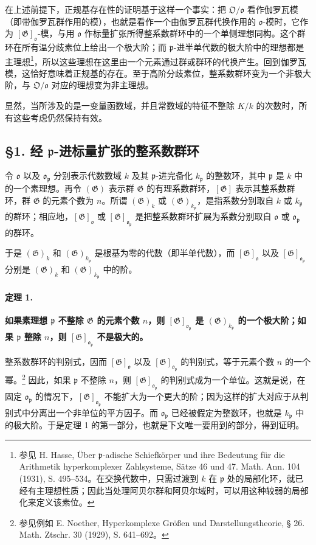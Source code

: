 \documentclass[11pt]{article}
\newcommand{\frakO}{\mathfrak O}
\newcommand{\frako}{\mathfrak o}
\newcommand{\frakp}{\mathfrak p}
\newcommand{\Gg}{\mathfrak G}
\newcommand{\srcemph}[1]{\textbf{#1}}
\begin{document}
在上述前提下，正规基存在性的证明基于这样一个事实：把 \(\frakO/\frako\) 看作伽罗瓦模（即带伽罗瓦群作用的模），也就是看作一个由伽罗瓦群代换作用的 \(\frako\)-模时，它作为 \([\Gg]_{\frako}\)-模，与用 \(\frako\) 作标量扩张所得整系数群环中的一个单侧理想同构。这个群环在所有温分歧素位上给出一个极大阶；而 \(\frakp\)-进半单代数的极大阶中的理想都是主理想\footnote{参见 H. Hasse, Über \(\frakp\)-adische Schiefkörper und ihre Bedeutung für die Arithmetik hyperkomplexer Zahlsysteme, Sätze 46 und 47. Math. Ann. 104 (1931), S. 495--534。在交换代数中，只需过渡到 \(k\) 在 \(\frakp\) 处的局部化环，就已经有主理想性质；因此当处理阿贝尔群和阿贝尔域时，可以用这种较弱的局部化来定义该素位。}，所以这些理想在这里由一个元素通过群或群环的代换产生。回到伽罗瓦模，这恰好意味着正规基的存在。至于高阶分歧素位，整系数群环变为一个非极大阶，与 \(\frakO/\frako\) 对应的理想变为非主理想。

显然，当所涉及的是一变量函数域，并且常数域的特征不整除 \(K/k\) 的次数时，所有这些考虑仍然保持有效。

\subsection*{§1. 经 \(\frakp\)-进标量扩张的整系数群环}

令 \(\frako\) 以及 \(\frako_\frakp\) 分别表示代数数域 \(k\) 及其 \(\frakp\)-进完备化 \(k_\frakp\) 的整数环，其中 \(\frakp\) 是 \(k\) 中的一个素理想。再令 \((\Gg)\) 表示群 \(\Gg\) 的有理系数群环，\([\Gg]\) 表示其整系数群环，群 \(\Gg\) 的元素个数为 \(n\)。所谓 \((\Gg)_k\) 或 \((\Gg)_{k_\frakp}\)，是指系数分别取自 \(k\) 或 \(k_\frakp\) 的群环；相应地，\([\Gg]_\frako\) 或 \([\Gg]_{\frako_\frakp}\) 是把整系数群环扩展为系数分别取自 \(\frako\) 或 \(\frako_\frakp\) 的群环。

于是 \((\Gg)_k\) 和 \((\Gg)_{k_\frakp}\) 是根基为零的代数（即半单代数），而 \([\Gg]_\frako\) 以及 \([\Gg]_{\frako_\frakp}\) 分别是 \((\Gg)_k\) 和 \((\Gg)_{k_\frakp}\) 中的阶。

\paragraph{定理 1.}
\srcemph{如果素理想 \(\frakp\) 不整除 \(\Gg\) 的元素个数 \(n\)，则 \([\Gg]_{\frako_\frakp}\) 是 \((\Gg)_{k_\frakp}\) 的一个极大阶；如果 \(\frakp\) 整除 \(n\)，则 \([\Gg]_{\frako_\frakp}\) 不是极大的。}

整系数群环的判别式，因而 \([\Gg]_\frako\) 以及 \([\Gg]_{\frako_\frakp}\) 的判别式，等于元素个数 \(n\) 的一个幂。\footnote{参见例如 E. Noether, Hyperkomplexe Größen und Darstellungstheorie, § 26. Math. Ztschr. 30 (1929), S. 641--692。} 因此，如果 \(\frakp\) 不整除 \(n\)，则 \([\Gg]_{\frako_\frakp}\) 的判别式成为一个单位。这就是说，在固定 \(\frako_\frakp\) 的情况下，\([\Gg]_{\frako_\frakp}\) 不能扩大为一个更大的阶；因为这样的扩大对应于从判别式中分离出一个非单位的平方因子。而 \(\frako_\frakp\) 已经被假定为整数环，也就是 \(k_\frakp\) 中的极大阶。于是定理 1 的第一部分，也就是下文唯一要用到的部分，得到证明。
\end{document}
